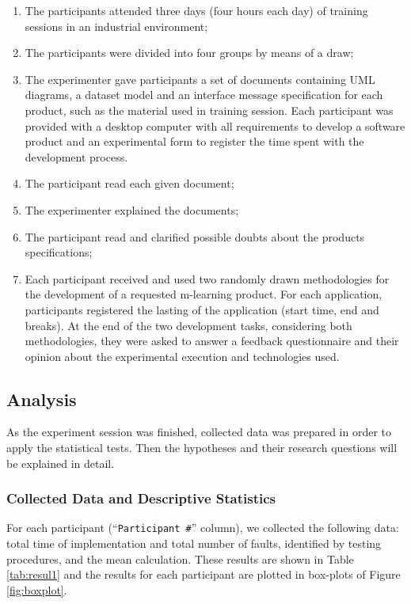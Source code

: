 \begin{enumerate}

\item The participants attended three days (four hours each day) of training sessions in an industrial environment;

\item The participants were divided into four groups by means of a draw;

\item The experimenter gave participants a set of documents containing UML diagrams, a dataset model and an interface message specification for each product, such as the material used in training session. Each participant was provided with a desktop computer with all requirements to develop a software product and an experimental form to register the time spent with the development process.
\item The participant read each given document;
\item The experimenter explained the documents;
\item The participant read and clarified possible doubts about the products specifications;
\item Each participant received and used two randomly drawn methodologies for the development of a requested m-learning product. For each application, participants registered the lasting of the application (start time, end and breaks). At the end of the two development tasks, considering both methodologies, they were asked to answer a feedback questionnaire and their opinion about the experimental execution and technologies used.
\end{enumerate}

\subsection{Analysis}\label{sub:analysis}

As the experiment session was finished, collected data was prepared in order to apply the statistical tests. Then the hypotheses and their research questions will be explained in detail.

\subsubsection*{Collected Data and Descriptive Statistics}

For each participant (``\texttt{Participant \#}'' column), we collected the following data: total time of implementation and total number of faults, identified by testing procedures, and the mean calculation. These results are shown in Table \ref{tab:resul1} and the results for each participant are plotted in box-plots of Figure \ref{fig:boxplot}. 

